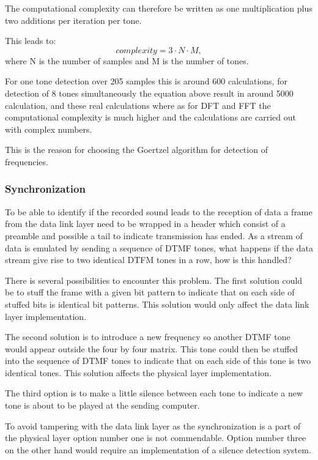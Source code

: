 		The computational complexity can therefore be written as one multiplication plus two additions per iteration per tone.

		This leads to:
		\begin{equation}complexity = 3\cdot N\cdot M,\end{equation}
		where N is the number of samples and M is the number of tones.
		
		For one tone detection over 205 samples this is around 600 calculations, for detection of 8 tones simultaneously the equation
		above result in around 5000 calculation, and these real calculations where as for DFT and FFT the computational complexity 
		is much higher and the calculations are carried out with complex numbers.
		
		This is the reason for choosing the Goertzel algorithm for detection of frequencies.
		
		\subsubsection{Synchronization}
		To be able to identify if the recorded sound leads to the reception of data a frame from the data link
		layer need to be wrapped in a header which consist of a preamble and possible a tail to indicate transmission has ended.
		As a stream of data is emulated by sending a sequence of DTMF tones, what happens if the data stream give rise to two identical
		DTFM tones in a row, how is this handled? 
		
		There is several possibilities to encounter this problem. The first solution could be to stuff the frame with a given bit
		pattern to indicate that on each side of stuffed bits is identical bit patterns. This solution would only affect the data 
		link layer implementation.
		
		The second solution is to introduce a new frequency so another DTMF tone would appear outside the four by four matrix.
		This tone could then be stuffed into the sequence of DTMF tones to indicate that on each side of this tone is two identical
		tones. This solution affects the physical layer implementation.
		
		The third option is to make a little silence between each tone to indicate a new tone is about to be played at the sending computer.
		
		To avoid tampering with the data link layer as the synchronization is a part of the physical layer option number one is not commendable. Option
		number three on the other hand would require an implementation of a silence detection system.
		
